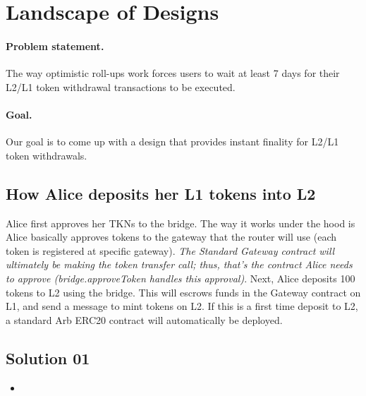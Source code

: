 
\section{Landscape of Designs}

\paragraph{Problem statement.} The way optimistic roll-ups work forces users to wait at least 7 days for their L2/L1 token withdrawal transactions to be executed. 
\paragraph{Goal.} Our goal is to come up with a design that provides instant finality for L2/L1 token withdrawals.

\subsection{How Alice deposits her L1 tokens into L2}

Alice first approves her TKNs to the bridge. The way it works under the hood is Alice basically approves tokens to the gateway that the router will use (each token is registered at specific gateway). 
\textit{The Standard Gateway contract will ultimately be making the token transfer call; thus, that's the contract Alice needs to approve (bridge.approveToken handles this approval)}. Next, Alice deposits 100 tokens to L2 using the bridge. This will escrows funds in the Gateway contract on L1, and send a message to mint tokens on L2. If this is a first time deposit to L2, a standard Arb ERC20 contract will automatically be deployed.

\subsection{Solution 01}



\begin{itemize}

\item 






\end{itemize}